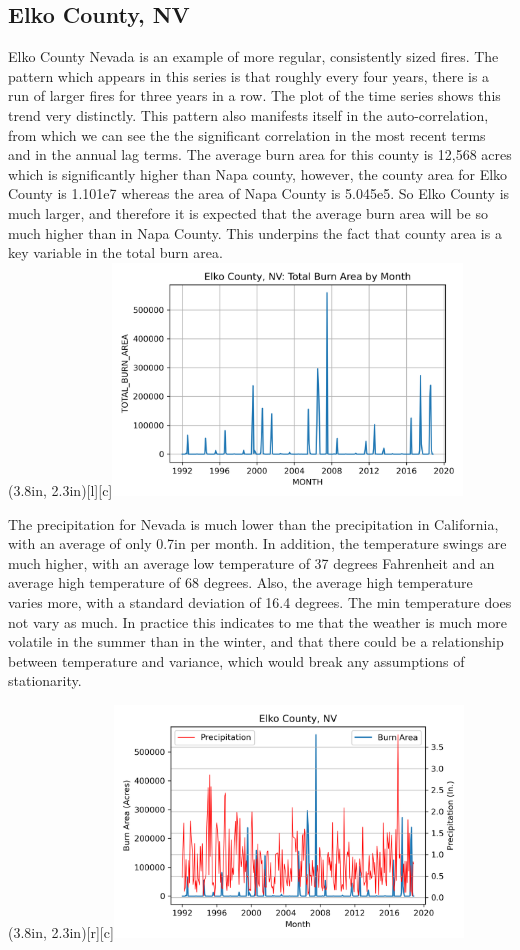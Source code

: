 \documentclass[12pt]{article}
\begin{document}
\subsection{\textrm{Elko County, NV}}

Elko County Nevada is an example of more regular, consistently sized fires. The pattern which appears in this series is that roughly every four years, there is a run of larger fires for three years in a row. The plot of the time series shows this trend very distinctly. This pattern also manifests itself in the auto-correlation, from which we can see the the significant correlation in the most recent terms and in the annual lag terms. The average burn area for this county is 12,568 acres which is significantly higher than Napa county, however, the county area for Elko County is 1.101e7 whereas the area of Napa County is 5.045e5. So Elko County is much larger, and therefore it is expected that the average burn area will be so much higher than in Napa County. This underpins the fact that county area is a key variable in the total burn area. \\

\parpic(3.8in, 2.3in)[l][c]{\includegraphics[width=3.65in]{./img/ElkoTimeSeriesPlot.png}}

The precipitation for Nevada is much lower than the precipitation in California, with an average of only 0.7in per month. In addition, the temperature swings are much higher, with an average low temperature of 37 degrees Fahrenheit and an average high temperature of 68 degrees. Also, the average high temperature varies more, with a standard deviation of 16.4 degrees. The min temperature does not vary as much. In practice this indicates to me that the weather is much more volatile in the summer than in the winter, and that there could be a relationship between temperature and variance, which would break any assumptions of stationarity. 

\parpic(3.8in, 2.3in)[r][c]{\includegraphics[width=3.65in]{./img/ElkoPrecipPlot.png}}
\end{document}
